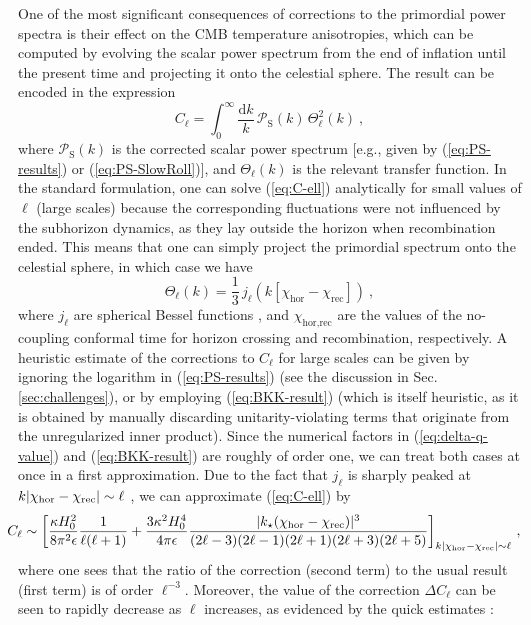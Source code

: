 \documentclass[12pt]{iopart}
\def\eq#1{\begin{equation}\begin{aligned}#1\end{aligned}\end{equation}}
\def\eref#1{(\ref{eq:#1})}
\def\D{\mathrm{d}}
\begin{document}
One of the most significant consequences of corrections to the primordial power spectra is their effect on the CMB temperature anisotropies, which can be computed by evolving the scalar power spectrum from the end of inflation until the present time and projecting it onto the celestial sphere. The result can be encoded in the expression
\begin{equation}\label{eq:C-ell}
C_\ell=\int_{0}^{\infty} \frac{\D k}{k}\,\mathcal{P}_\text{S}(k)\,\Theta_{\ell}^2(k) \ ,
\end{equation}
where $\mathcal{P}_\text{S}(k)$ is the corrected scalar power spectrum [e.g., given by \eref{PS-results} or \eref{PS-SlowRoll}], and $\Theta_{\ell}(k)$ is the relevant transfer function. In the standard formulation, one can solve \eref{C-ell} analytically for small values of $\ell$ (large scales) because the corresponding fluctuations were not influenced by the subhorizon dynamics, as they lay outside the horizon when recombination ended. This means that one can simply project the primordial spectrum onto the celestial sphere, in which case we have
\begin{equation}
\Theta_{\ell}(k)=\frac{1}{3}\,j_\ell(k[\chi_\text{hor}-\chi_{\text{rec}}]) \ ,
\end{equation}
where $j_\ell$ are spherical Bessel
functions \citep{Dodelson:2003ft}, and $\chi_{\text{hor,rec}}$ are the values of the no-coupling conformal time for horizon crossing and recombination, respectively. A heuristic estimate of the corrections to $C_{\ell}$ for large scales can be given by ignoring the logarithm in \eref{PS-results} (see the discussion in Sec. \ref{sec:challenges}), or by employing \eref{BKK-result} (which is itself heuristic, as it is obtained by manually discarding unitarity-violating terms that originate from the unregularized inner product). Since the numerical factors in \eref{delta-q-value} and \eref{BKK-result} are roughly of order one, we can treat both cases at once in a first approximation. Due to the fact that $j_{\ell}$ is sharply peaked at $k|\chi_{\rm hor}-\chi_{\rm rec}|\sim\ell$ \citep{Baumann:2009ds}, we can approximate \eref{C-ell} by
\eq{
\!\!\!\!\!C_{\ell} \sim \left[\frac{\kappa H_0^2}{8\pi^2\epsilon} \frac{1}{\ell(\ell+1)}+\frac{3\kappa^2 H_0^4}{4\pi\epsilon}
\frac{|k_{\star}(\chi_\text{hor}-\chi_{\text{rec}})|^3}{(2\ell-3)(2\ell-1)(2\ell+1)(2\ell+3)(2\ell+5)}\right]_{k|\chi_{\rm hor}-\chi_{\rm rec}|\sim\ell} \,,
}
where one sees that the ratio of the correction (second term) to the usual result (first term) is of order $\ell^{-3}$. Moreover, the value of the correction $\Delta C_{\ell}$ can be seen to rapidly decrease as $\ell$ increases, as evidenced by the quick estimates \citep{Brizuela:2016gnz}:
\end{document}
